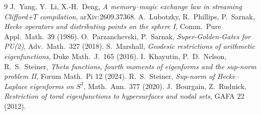 \documentclass[11pt]{amsart}
\theoremstyle{remark}
\begin{document}
\begin{thebibliography}{9}
 J.~Yang, Y.~Li, X.-H.~Deng, \emph{A memory--magic exchange law in streaming Clifford+$T$ compilation}, arXiv:2609.37368.
 A.~Lubotzky, R.~Phillips, P.~Sarnak, \emph{Hecke operators and distributing points on the sphere I}, Comm.\ Pure Appl.\ Math.\ 39 (1986).
 O.~Parzanchevski, P.~Sarnak, \emph{Super-Golden-Gates for PU(2)}, Adv.\ Math.\ 327 (2018).
 S.~Marshall, \emph{Geodesic restrictions of arithmetic eigenfunctions}, Duke Math.\ J.\ 165 (2016).
 I.~Khayutin, P.~D.~Nelson, R.~S.~Steiner, \emph{Theta functions, fourth moments of eigenforms and the sup-norm problem II}, Forum Math.\ Pi 12 (2024).
 R.~S.~Steiner, \emph{Sup-norm of Hecke--Laplace eigenforms on $S^3$}, Math.\ Ann.\ 377 (2020).
 J.~Bourgain, Z.~Rudnick, \emph{Restriction of toral eigenfunctions to hypersurfaces and nodal sets}, GAFA 22 (2012).
\end{thebibliography}
\end{document}
